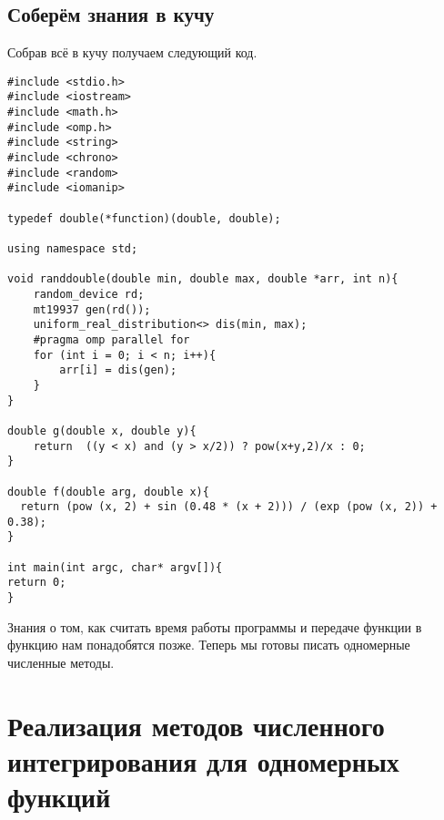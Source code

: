 \documentclass{article}
\begin{document}
\subsection{Соберём знания в кучу}
Собрав всё в кучу получаем следующий код.
\begin{lstlisting}
#include <stdio.h>
#include <iostream>
#include <math.h>
#include <omp.h>
#include <string>
#include <chrono>
#include <random>
#include <iomanip> 

typedef double(*function)(double, double);

using namespace std;

void randdouble(double min, double max, double *arr, int n){
    random_device rd;
    mt19937 gen(rd());
    uniform_real_distribution<> dis(min, max);
    #pragma omp parallel for
    for (int i = 0; i < n; i++){
        arr[i] = dis(gen);
    }
}

double g(double x, double y){
    return  ((y < x) and (y > x/2)) ? pow(x+y,2)/x : 0;
}

double f(double arg, double x){
  return (pow (x, 2) + sin (0.48 * (x + 2))) / (exp (pow (x, 2)) + 0.38);
}

int main(int argc, char* argv[]){
return 0;
}
\end{lstlisting}
Знания о том, как считать время работы программы и передаче функции в функцию нам понадобятся позже. Теперь мы готовы писать одномерные численные методы.
\section{Реализация методов численного интегрирования для одномерных функций}
\end{document}
